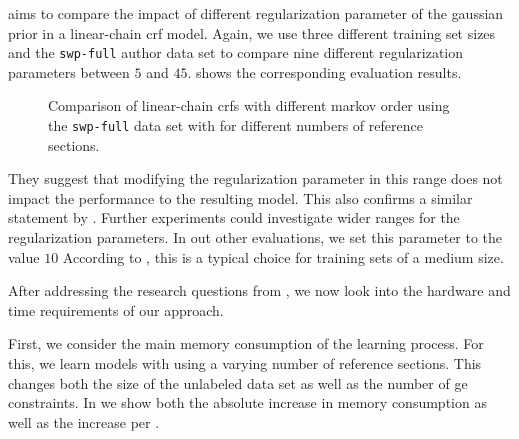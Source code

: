 \bigskip


 aims to compare the impact of different \gls{regularization parameter} of the \gls{gaussian prior} in a \gls{linear-chain crf} model.
Again, we use three different training set sizes and the \texttt{swp-full} author data set to compare nine different \glspl{regularization parameter} between $5$ and $45$.
 shows the corresponding evaluation results.
\begin{figure}[t]

\caption{Comparison of \glspl{linear-chain crf} with different \gls{markov order} using the \texttt{swp-full} data set with for different numbers of reference sections.}
\label{fig:eval-gaussian}
\end{figure}
They suggest that modifying the \gls{regularization parameter} in this range does not impact the performance to the resulting model.
This also confirms a similar statement by \citet{sutton2010introduction}.
Further experiments could investigate wider ranges for the \glspl{regularization parameter}.
In out other evaluations, we set this parameter to the value $10$
According to \citet{sutton2010introduction}, this is a typical choice for training sets of a medium size.


\bigskip

After addressing the research questions from , we now look into the hardware and time requirements of our approach.

First, we consider the main memory consumption of the learning process.
For this, we learn models with using a varying number of reference sections.
This changes both the size of the unlabeled data set as well as the number of \gls{ge} constraints.
In  we show both the absolute increase in memory consumption as well as the increase per .







